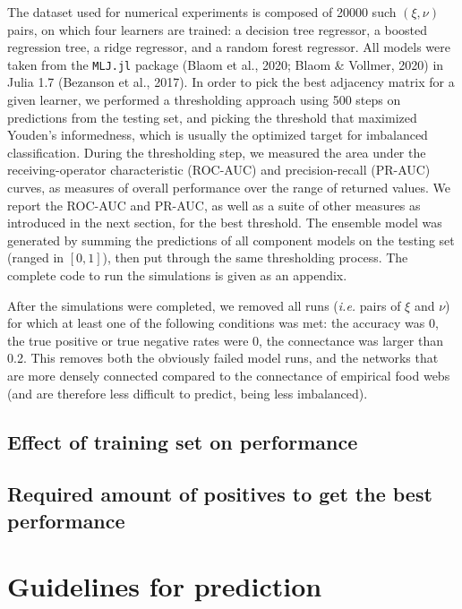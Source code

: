 \documentclass[11pt]{article}
\begin{document}
The dataset used for numerical experiments is composed of 20000 such
\((\xi, \nu)\) pairs, on which four learners are trained: a decision
tree regressor, a boosted regression tree, a ridge regressor, and a
random forest regressor. All models were taken from the \texttt{MLJ.jl}
package (Blaom et al., 2020; Blaom \& Vollmer, 2020) in Julia 1.7
(Bezanson et al., 2017). In order to pick the best adjacency matrix for
a given learner, we performed a thresholding approach using 500 steps on
predictions from the testing set, and picking the threshold that
maximized Youden's informedness, which is usually the optimized target
for imbalanced classification. During the thresholding step, we measured
the area under the receiving-operator characteristic (ROC-AUC) and
precision-recall (PR-AUC) curves, as measures of overall performance
over the range of returned values. We report the ROC-AUC and PR-AUC, as
well as a suite of other measures as introduced in the next section, for
the best threshold. The ensemble model was generated by summing the
predictions of all component models on the testing set (ranged in
\([0,1]\)), then put through the same thresholding process. The complete
code to run the simulations is given as an appendix.

After the simulations were completed, we removed all runs (\emph{i.e.}
pairs of \(\xi\) and \(\nu\)) for which at least one of the following
conditions was met: the accuracy was 0, the true positive or true
negative rates were 0, the connectance was larger than 0.2. This removes
both the obviously failed model runs, and the networks that are more
densely connected compared to the connectance of empirical food webs
(and are therefore less difficult to predict, being less imbalanced).

\hypertarget{effect-of-training-set-on-performance}{%
\subsection{Effect of training set on
performance}\label{effect-of-training-set-on-performance}}

\hypertarget{required-amount-of-positives-to-get-the-best-performance}{%
\subsection{Required amount of positives to get the best
performance}\label{required-amount-of-positives-to-get-the-best-performance}}

\hypertarget{guidelines-for-prediction}{%
\section{Guidelines for prediction}\label{guidelines-for-prediction}}
\end{document}
